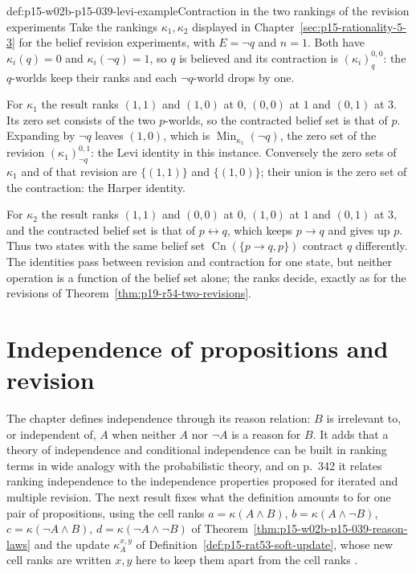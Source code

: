 \begin{hbexample}{def:p15-w02b-p15-039-levi-example}{Contraction in the two rankings of the revision experiments}
Take the rankings \(\kappa_1,\kappa_2\) displayed in
Chapter~\ref{sec:p15-rationality-5-3} for the belief revision experiments,
with \(E=\neg q\) and \(n=1\).  Both have \(\kappa_i(q)=0\) and
\(\kappa_i(\neg q)=1\), so \(q\) is believed and its contraction is
\((\kappa_i)^{0,0}_q\): the \(q\)-worlds keep their ranks and each
\(\neg q\)-world drops by one.

For \(\kappa_1\) the result ranks \((1,1)\) and \((1,0)\) at \(0\),
\((0,0)\) at \(1\) and \((0,1)\) at \(3\).  Its zero set consists of the two
\(p\)-worlds, so the contracted belief set is that of \(p\).  Expanding by
\(\neg q\) leaves \((1,0)\), which is \(\operatorname{Min}_{\kappa_1}(\neg q)\),
the zero set of the revision \((\kappa_1)^{0,1}_{\neg q}\): the Levi identity
in this instance.  Conversely the zero sets of \(\kappa_1\) and of that
revision are \(\{(1,1)\}\) and \(\{(1,0)\}\); their union is the zero set of
the contraction: the Harper identity.

For \(\kappa_2\) the result ranks \((1,1)\) and \((0,0)\) at \(0\),
\((1,0)\) at \(1\) and \((0,1)\) at \(3\), and the contracted belief set is
that of \(p\leftrightarrow q\), which keeps \(p\to q\) and gives up \(p\).
Thus two states with the same belief set
\(\operatorname{Cn}(\{p\to q,p\})\) contract \(q\) differently.  The
identities pass between revision and contraction for one state, but neither
operation is a function of the belief set alone; the ranks decide, exactly as
for the revisions of Theorem~\ref{thm:p19-r54-two-revisions}.
\end{hbexample}

\section{Independence of propositions and revision}
\label{sec:p15-w02b-p15-039-independence}

The chapter defines independence through its reason relation: \(B\) is
irrelevant to, or independent of, \(A\) when neither \(A\) nor \(\neg A\) is
a reason for \(B\).  It adds that a theory of independence and conditional
independence can be built in ranking terms in wide analogy with the
probabilistic theory, and on p.~342 it relates ranking independence to the
independence properties proposed for iterated and multiple revision.  The
next result fixes what the definition amounts to for one pair of
propositions, using the cell ranks
\(a=\kappa(A\land B)\), \(b=\kappa(A\land\neg B)\), \(c=\kappa(\neg A\land B)\),
\(d=\kappa(\neg A\land\neg B)\) of
Theorem~\ref{thm:p15-w02b-p15-039-reason-laws} and the update
\(\kappa^{x,y}_A\) of Definition~\ref{def:p15-rat53-soft-update}, whose new
cell ranks are written \(x,y\) here to keep them apart from the cell ranks
\parencite[pp.~340, 342]{KernIsbernerSkovgaardOlsenSpohn2021Ranking}.

